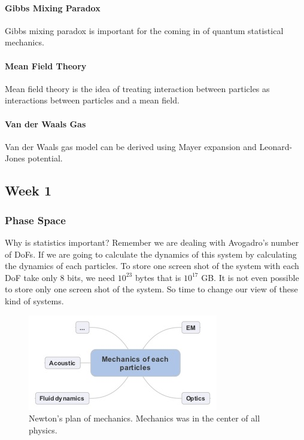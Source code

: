 \documentclass[letterpaper,10pt,english]{sphinxmanual}
\begin{document}
\paragraph{Gibbs Mixing Paradox}
\label{equilibrium/summary1:gibbs-mixing-paradox}
Gibbs mixing paradox is important for the coming in of quantum statistical mechanics.


\paragraph{Mean Field Theory}
\label{equilibrium/summary1:mean-field-theory}
Mean field theory is the idea of treating interaction between particles as interactions between particles and a mean field.


\paragraph{Van der Waals Gas}
\label{equilibrium/summary1:van-der-waals-gas}
Van der Waals gas model can be derived using Mayer expansion and Leonard-Jones potential.


\subsection{Week 1}
\label{equilibrium/week1:week-1}\label{equilibrium/week1:index-0}\label{equilibrium/week1::doc}

\subsubsection{Phase Space}
\label{equilibrium/week1:phase-space}\label{equilibrium/week1:index-1}
Why is statistics important? Remember we are dealing with Avogadro's number of DoFs. If we are going to calculate the dynamics of this system by calculating the dynamics of each particles. To store one screen shot of the system with each DoF take only 8 bits, we need $10^23$ bytes that is $10^17$ GB. It is not even possible to store only one screen shot of the system. So time to change our view of these kind of systems.
\begin{figure}[htbp]
\centering
\capstart

\includegraphics[width=0.600\linewidth]{newtonsDream.jpg}
\caption{Newton's plan of mechanics. Mechanics was in the center of all physics.}\end{figure}
\end{document}
